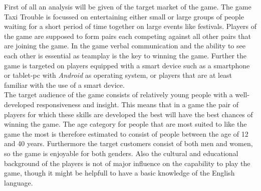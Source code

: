 First of all an analysis will be given of the target market of the game. The game Taxi Trouble is focussed on entertaining either small or large groups of people waiting for a short period of time together on large events like festivals. Players of the game are supposed to form pairs each competing against all other pairs that are joining the game. In the game verbal communication and the ability to see each other is essential as teamplay is the key to winning the game. Further the game is targeted on players equipped with a smart device such as a smartphone or tablet-pc with \textit{Android} as operating system, or players that are at least familiar with the use of a smart device.\\
The target audience of the game consists of relatively young people with a well-developed responsiveness and insight. This means that in a game the pair of players for which these skills are developed the best will have the best chances of winning the game. The age category for people that are most suited to like the game the most is therefore estimated to consist of people between the age of 12 and 40 years. Furthermore the target customers consist of both men and women, so the game is enjoyable for both genders. Also the cultural and educational background of the players is not of major influence on the capability to play the game, though it might be helpfull to have a basic knowledge of the English language.
     